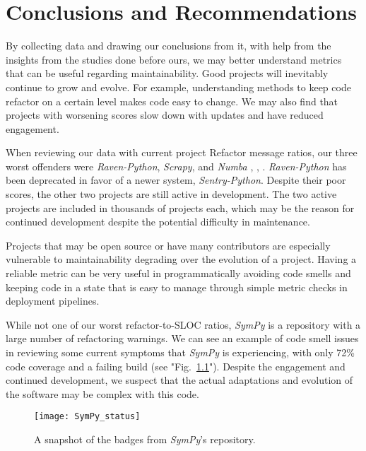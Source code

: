 \chapter{Conclusions and Recommendations} \label{chapterConclusion}


By collecting data and drawing our conclusions from it, with help from the insights from the studies done before ours, we may better understand metrics that can be useful regarding maintainability. Good projects will inevitably continue to grow and evolve. For example, understanding methods to keep code refactor on a certain level makes code easy to change. We may also find that projects with worsening scores slow down with updates and have reduced engagement.

When reviewing our data with current project Refactor message ratios, our three worst offenders were \emph{Raven-Python}, \emph{Scrapy}, and \emph{Numba} \cite{data:raven-python}, \cite{data:scrapy}, \cite{data:numba}.  \emph{Raven-Python} has been deprecated in favor of a newer system,  \emph{Sentry-Python}. Despite their poor scores, the other two projects are still active in development. The two active projects are included in thousands of projects each, which may be the reason for continued development despite the potential difficulty in maintenance.

Projects that may be open source or have many contributors are especially vulnerable to maintainability degrading over the evolution of a project. Having a reliable metric can be very useful in programmatically avoiding code smells and keeping code in a state that is easy to manage through simple metric checks in deployment pipelines.

While not one of our worst refactor-to-SLOC ratios, \emph{SymPy} is a repository with a large number of refactoring warnings. We can see an example of code smell issues in reviewing some current symptoms that \emph{SymPy} is experiencing, with only 72\% code coverage and a failing build (see "Fig.~\ref{figSymPyStatus}"). Despite the engagement and continued development, we suspect that the actual adaptations and evolution of the software may be complex with this code.

\begin{figure}[ht]
  \centerline{
    \texttt{[image: SymPy\_status]}
  }
  \caption{A snapshot of the badges from \emph{SymPy}'s repository.}
    \label{figSymPyStatus}
\end{figure}

